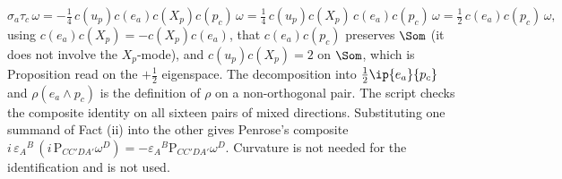 \[
\sigma_a\tau_c\,\omega = -\tfrac14\,c(u_p)c(e_a)c(X_p)c(p_c)\,\omega = \tfrac14\,c(u_p)c(X_p)\,c(e_a)c(p_c)\,\omega = \tfrac12\,c(e_a)c(p_c)\,\omega ,
\]
using $c(e_a)c(X_p) = -c(X_p)c(e_a)$, that $c(e_a)c(p_c)$ preserves $\Som$ (it does not involve the $X_p$-mode), and $c(u_p)c(X_p) = 2$ on $\Som$, which is Proposition  read on the $+\tfrac12$ eigenspace. The decomposition into $\tfrac12\ip{e_a}{p_c}$ and $\rho(e_a\wedge p_c)$ is the definition of $\rho$ on a non-orthogonal pair. The script checks the composite identity on all sixteen pairs of mixed directions. Substituting one summand of Fact (ii) into the other gives Penrose's composite $i\,\varepsilon_A{}^B\,(i\,\mathrm{P}_{CC'DA'}\omega^D) = -\varepsilon_A{}^B\mathrm{P}_{CC'DA'}\omega^D$. Curvature is not needed for the identification and is not used.
